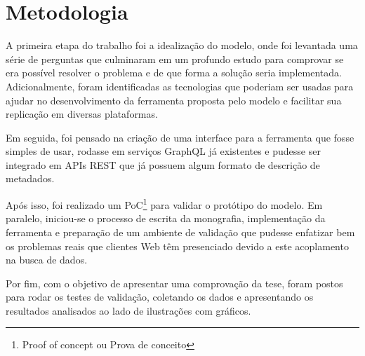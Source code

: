 \section[Metodologia]{Metodologia}

A primeira etapa do trabalho foi a idealização do modelo, onde foi levantada uma série de perguntas que culminaram em um profundo estudo para comprovar se era possível resolver o problema e de que forma a solução seria implementada. Adicionalmente, foram identificadas as tecnologias que poderiam ser usadas para ajudar no desenvolvimento da ferramenta proposta pelo modelo e facilitar sua replicação em diversas plataformas.

Em seguida, foi pensado na criação de uma interface para a ferramenta que fosse simples de usar, rodasse em serviços GraphQL já existentes e pudesse ser integrado em APIs REST que já possuem algum formato de descrição de metadados.

Após isso, foi realizado um PoC\footnote{
  Proof of concept ou Prova de conceito
} para validar o protótipo do modelo. Em paralelo, iniciou-se o processo de escrita da monografia, implementação da ferramenta e preparação de um ambiente de validação que pudesse enfatizar bem os problemas reais que clientes Web têm presenciado devido a este acoplamento na busca de dados. 

Por fim, com o objetivo de apresentar uma comprovação da tese, foram postos para rodar os testes de validação, coletando os dados e apresentando os resultados analisados ao lado de ilustrações com gráficos.